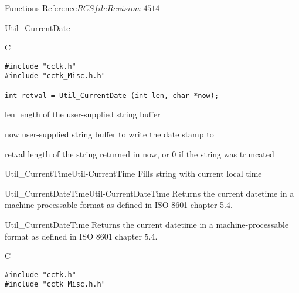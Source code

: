 \begin{cactuspart}{ Functions Reference}{$RCSfile$}{$Revision: 4514 $}
\begin{FunctionDescription}{Util\_CurrentDate}
\begin{SynopsisSection}
\begin{Synopsis}{C}
\begin{verbatim}
#include "cctk.h"
#include "cctk_Misc.h.h"

int retval = Util_CurrentDate (int len, char *now);
\end{verbatim}
\end{Synopsis}
\end{SynopsisSection}

\begin{ParameterSection}
\begin{Parameter}{len}
length of the user-supplied string buffer 
\end{Parameter}
\begin{Parameter}{now}
user-supplied string buffer to write the date stamp to
\end{Parameter}
\end{ParameterSection}

\begin{ResultSection}
\begin{Result}{retval}
length of the string returned in {\code now}, or 0 if the string was truncated
\end{Result}
\end{ResultSection}

\begin{SeeAlsoSection}
\begin{SeeAlso2}{Util\_CurrentTime}{Util-CurrentTime}
  Fills string with current local time
\end{SeeAlso2}
\begin{SeeAlso2}{Util\_CurrentDateTime}{Util-CurrentDateTime}
  Returns the current datetime in a machine-processable format
  as defined in ISO 8601 chapter 5.4.
\end{SeeAlso2}
\end{SeeAlsoSection}

\end{FunctionDescription}


\begin{FunctionDescription}{Util\_CurrentDateTime}
\label{Util-CurrentDateTime}
Returns the current datetime in a machine-processable format
as defined in ISO 8601 chapter 5.4.

\begin{SynopsisSection}
\begin{Synopsis}{C}
\begin{verbatim}
#include "cctk.h"
#include "cctk_Misc.h.h"


\end{verbatim}
\end{Synopsis}
\end{SynopsisSection}
\end{FunctionDescription}
\end{cactuspart}
